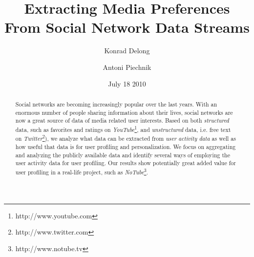 \documentclass{article}
\def\ie{{i.e. }}
\begin{document}
\title{\textbf{Extracting Media Preferences From Social Network Data Streams}}
\author{Konrad Delong \and Antoni Piechnik}
\date{July 18 2010}

\maketitle

\begin{abstract} Social networks are becoming increasingly popular over the last
years. With an enormous number of people sharing information about their lives,
social networks are now a great source of data of media related user interests. Based on both
\textit{structured} data, such as favorites and ratings on \textit{YouTube}\footnote{http://www.youtube.com},
and \textit{unstructured} data, \ie free text on \textit{Twitter}\footnote{http://www.twitter.com}),
we analyze what data can be extracted from \textit{user activity data} as well as how useful that data
is for user profiling and personalization. We focus on aggregating and analyzing the publicly available
data and identify several ways of employing the user activity data for user profiling.
Our results show potentially great added value for user profiling in a real-life project, such as \textit{NoTube}\footnote{http://www.notube.tv}.

\end{abstract}



















\end{document}

